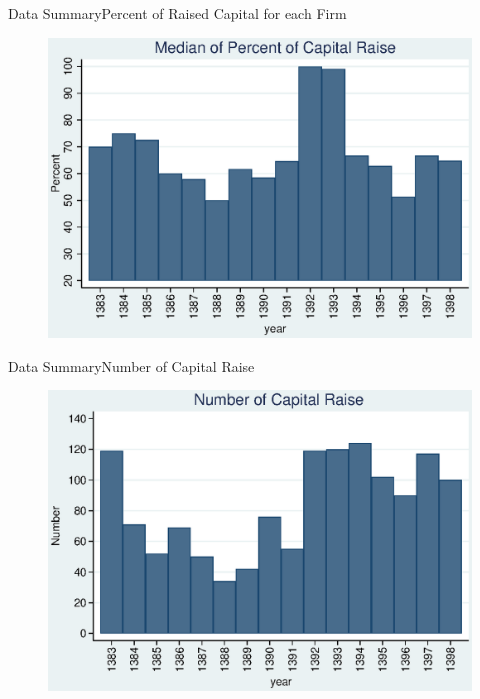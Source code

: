 \documentclass{beamer}
\begin{document}
\begin{frame}{Data Summary}{Percent of Raised Capital for each Firm}
\begin{figure}
\centering
\includegraphics[width=0.7\linewidth]{MedianPercent.eps}
\label{fig:medianpercent}
\end{figure}
\end{frame}

\begin{frame}{Data Summary}{Number of Capital Raise}
\begin{figure}
\centering
\includegraphics[width=0.7\linewidth]{Number.eps}
\label{fig:number}
\end{figure}
\end{frame}
\end{document}
